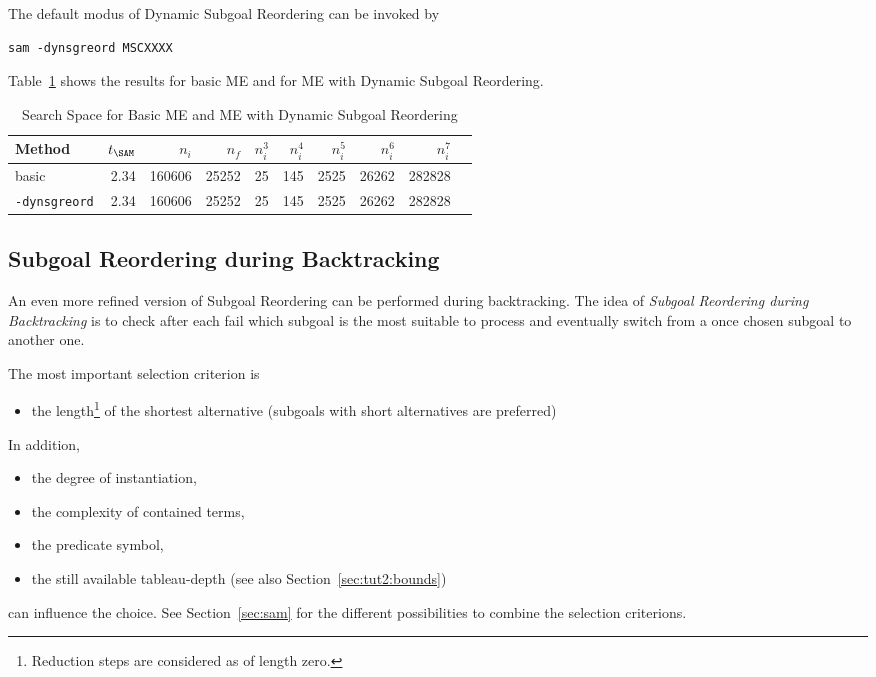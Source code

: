 The default modus of Dynamic Subgoal Reordering can be invoked by
\begin{center}
\begin{verbatim}
sam -dynsgreord MSCXXXX
\end{verbatim}
\end{center}

Table~\ref{tab:tut2:results.dynsgreord} shows the results for basic
ME and for ME with Dynamic Subgoal Reordering.

\begin{table}[htb]
\begin{center}
\begin{tabular}{|l|r|r||r|r||r|r|r|r|r|}
\hline
Method & $t_{\SAM}$ & $n_i$ & $n_f$ & 
	$n_i^3$ & $n_i^4$ & $n_i^5$ & $n_i^6$ & $n_i^7$ \\
\hline\hline
basic & 2.34 & 160606 & 25252 &
	25 & 145 & 2525 & 26262 & 282828 \\
\hline
{\tt -dynsgreord} & 2.34 & 160606 & 25252 &
	25 & 145 & 2525 & 26262 & 282828 \\
\hline\hline
\end{tabular}
\end{center}
\caption{Search Space for Basic ME and ME with Dynamic Subgoal Reordering} 
\label{tab:tut2:results.dynsgreord}
\end{table}


\subsection{Subgoal Reordering during Backtracking}

An even more refined version of Subgoal Reordering can be performed
during backtracking. The idea of {\em Subgoal Reordering during
Backtracking\/} is to check after each fail which subgoal is the most
suitable to process and eventually switch from a once chosen subgoal
to another one.

The most important selection criterion is 
\begin{itemize}
\item the length\footnote{Reduction steps are considered as of length
		zero.} 
	of the shortest alternative (subgoals with short alternatives
	are preferred) 
\end{itemize}
In addition,
\begin{itemize}
\item the degree of instantiation,
\item the complexity of contained terms,
\item the predicate symbol,
\item the still available tableau-depth (see
	also Section~\ref{sec:tut2:bounds})
\end{itemize}
can influence the choice. See Section~\ref{sec:sam} for the different
possibilities to combine the selection criterions.

